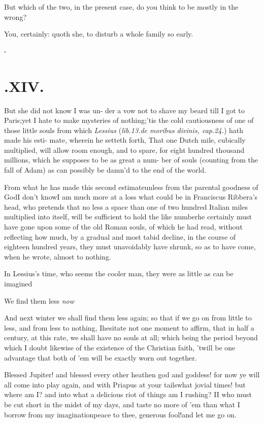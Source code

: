 \documentclass{article}
\begin{document}
\tsh But which of the two, in the present case, do you
think to be mostly in the wrong?

You, certainly\thinspace: quoth she, to disturb a whole family so
early.

\vfill{}\eject
\null\kern-\baselineskip
\section{.\enspace XIV.}

\quad\tsh But she did not know I was un-\break
der a vow not to shave my beard till I\break
got to Paris;\tsh yet I hate to make\break
mysteries of nothing;\tsh ’tis the cold\break
cautiousness of one of those little souls\break
from which \textit{Lessius} (\textit{lib.\@ 13.\@ de moribus\break
divinis, cap.\@ 24.}) hath made his esti-\break
mate, wherein he setteth forth, That\break
one Dutch mile, cubically multiplied,\break
will allow room enough, and to spare,\break
for eight hundred thousand millions,\break
which he supposes to be as great a num-\break
ber of souls (counting from the fall of\break
Adam) as can possibly be damn’d to\break
the end of the world.

From what he has made this second estimate\tsh unless
from the parental goodness of God\tsk I don’t know\tsk I
am much more at a loss what could be in Franciscus
Ribbera’s head, who pretends that no less a space than
one of two hundred Italian miles multiplied into itself,
will be sufficient to hold the like number\tsh he
certainly must have gone upon some of the old Roman souls,
of which he had read, without reflecting how much, by a gradual and
most tabid decline, in the course of eighteen hundred years, they
must unavoidably have shrunk, so as to have come, when he wrote,
almost to nothing.

In Lessius’s time, who seems the cooler man, they
were as little as can be imagined\tsh

\tsh We find them less \textit{now}\tsh

And next winter we shall find them less again; so that if we go
on from little to less, and from less to nothing, I\break hesitate not
one moment to affirm, that in half a century, at this rate, we shall
have no souls at all; which being the period beyond which I doubt
likewise of the existence of the Christian faith, ’twill be
one advantage that both of ’em will be exactly worn out
together.\tsh

Blessed Jupiter! and blessed every other heathen god and goddess! for now ye will
all come into play again, and with Priapus at your tails\tsh\break what jovial times!\tsh
but where am I? and into what a delicious riot of things am I rushing? I\tsh I
who\break
must be cut short in the midst of my days, and taste no more of ’em than what I
borrow from my imagination\tsh peace to thee, generous fool!\break and let me go on.
\end{document}
